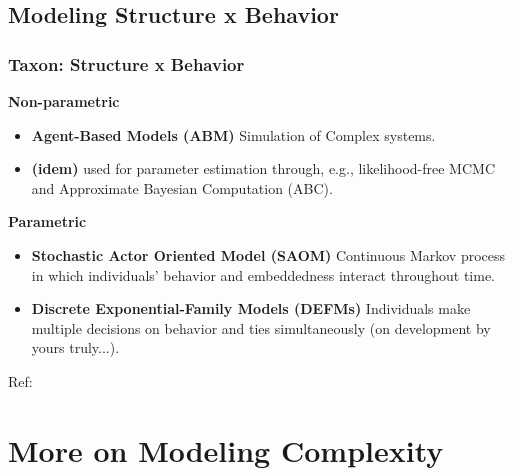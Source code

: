 \documentclass[aspectratio=169,10pt]{beamer}
\begin{document}
\subsection{Modeling Structure x Behavior}

\begin{frame}
	\frametitle{Taxon: Structure x Behavior}
\pause
	\textbf{Non-parametric}
	\begin{itemize}
		\item \textbf{Agent-Based Models (ABM)} Simulation of Complex systems.
		\item \textbf{(idem)} used for parameter estimation through, e.g., likelihood-free MCMC and Approximate Bayesian Computation (ABC).
	\end{itemize}
\pause
	\textbf{Parametric}
	\begin{itemize}
		\item \textbf{Stochastic Actor Oriented Model (SAOM)} Continuous Markov process in which individuals' behavior and embeddedness interact throughout time.
		\item \textbf{Discrete Exponential-Family Models (DEFMs)} Individuals make multiple decisions on behavior and ties simultaneously (on development by yours truly...).
	\end{itemize}

Ref: \textcite{Tisue2004,Snijders2010intro,Csille2010,Marjoram2003}

\end{frame}

\section{More on Modeling Complexity}
\end{document}
